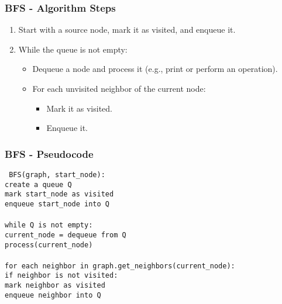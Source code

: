 \documentclass[aspectratio=169]{beamer}
\begin{document}
\begin{frame}[fragile]
    \frametitle{BFS - Algorithm Steps}
    \begin{enumerate}
        \item Start with a source node, mark it as visited, and enqueue it.
        \item While the queue is not empty:
            \begin{itemize}
                \item Dequeue a node and process it (e.g., print or perform an operation).
                \item For each unvisited neighbor of the current node:
                    \begin{itemize}
                        \item Mark it as visited.
                        \item Enqueue it.
                    \end{itemize}
            \end{itemize}
    \end{enumerate}
\end{frame}

\begin{frame}[fragile]
    \frametitle{BFS - Pseudocode}
    \begin{center}
        \texttt{
            BFS(graph, start\_node): \\ 
            \quad create a queue Q \\ 
            \quad mark start\_node as visited \\ 
            \quad enqueue start\_node into Q \\ 
            \\ 
            \quad while Q is not empty: \\ 
            \quad \quad current\_node = dequeue from Q \\ 
            \quad \quad process(current\_node) \\ 
            \\ 
            \quad \quad for each neighbor in graph.get\_neighbors(current\_node): \\ 
            \quad \quad \quad if neighbor is not visited: \\ 
            \quad \quad \quad \quad mark neighbor as visited \\ 
            \quad \quad \quad \quad enqueue neighbor into Q
        }
    \end{center}
\end{frame}
\end{document}
